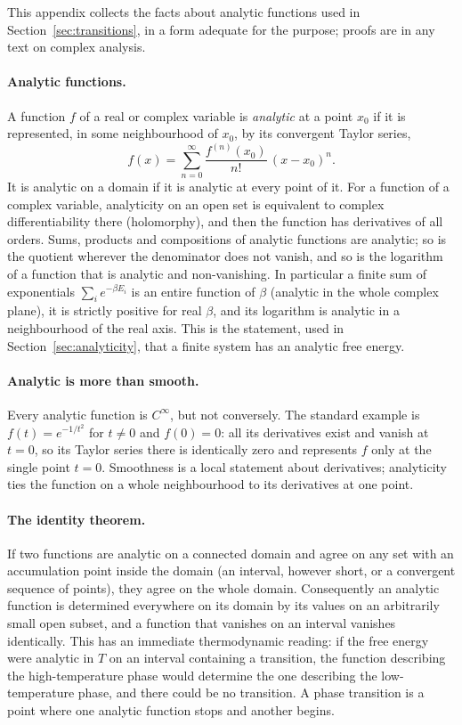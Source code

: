 \documentclass[10pt,a4paper]{article}
\theoremstyle{remark}
\begin{document}
This appendix collects the facts about analytic functions used in
Section~\ref{sec:transitions}, in a form adequate for the purpose; proofs are
in any text on complex analysis.

\paragraph{Analytic functions.} A function $f$ of a real or complex variable
is \emph{analytic} at a point $x_0$ if it is represented, in some
neighbourhood of $x_0$, by its convergent Taylor series,
\[
  f(x)=\sum_{n=0}^{\infty}\frac{f^{(n)}(x_0)}{n!}\,(x-x_0)^{n} .
\]
It is analytic on a domain if it is analytic at every point of it. For a
function of a complex variable, analyticity on an open set is equivalent to
complex differentiability there (holomorphy), and then the function has
derivatives of all orders. Sums, products and compositions of analytic
functions are analytic; so is the quotient wherever the denominator does not
vanish, and so is the logarithm of a function that is analytic and
non-vanishing. In particular a finite sum of exponentials $\sum_ie^{-\beta E_i}$
is an entire function of $\beta$ (analytic in the whole complex plane), it is
strictly positive for real $\beta$, and its logarithm is analytic in a
neighbourhood of the real axis. This is the statement, used in
Section~\ref{sec:analyticity}, that a finite system has an analytic free
energy.

\paragraph{Analytic is more than smooth.} Every analytic function is
$C^{\infty}$, but not conversely. The standard example is
$f(t)=e^{-1/t^{2}}$ for $t\neq0$ and $f(0)=0$: all its derivatives exist and
vanish at $t=0$, so its Taylor series there is identically zero and represents
$f$ only at the single point $t=0$. Smoothness is a local statement about
derivatives; analyticity ties the function on a whole neighbourhood to its
derivatives at one point.

\paragraph{The identity theorem.} If two functions are analytic on a connected
domain and agree on any set with an accumulation point inside the domain (an
interval, however short, or a convergent sequence of points), they agree on
the whole domain. Consequently an analytic function is determined everywhere
on its domain by its values on an arbitrarily small open subset, and a
function that vanishes on an interval vanishes identically. This has an
immediate thermodynamic reading: if the free energy were analytic in $T$ on
an interval containing a transition, the function describing the
high-temperature phase would determine the one describing the low-temperature
phase, and there could be no transition. A phase transition is a point where
one analytic function stops and another begins.
\end{document}
